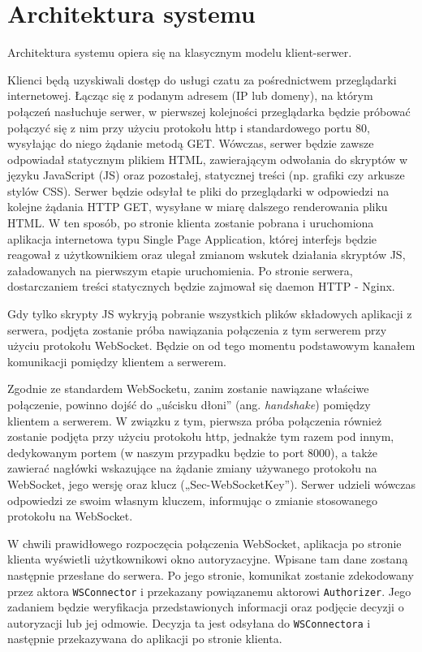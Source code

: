 \section{Architektura systemu}
\label{chat_architektura_systemu}

Architektura systemu opiera się na klasycznym modelu klient-serwer.

Klienci będą uzyskiwali dostęp do usługi czatu za pośrednictwem przeglądarki
internetowej. Łącząc się z podanym adresem (IP lub domeny), na którym połączeń
nasłuchuje serwer, w pierwszej kolejności przeglądarka będzie próbować połączyć
się z nim przy użyciu protokołu http i standardowego portu 80, wysyłając do
niego żądanie metodą GET. Wówczas, serwer będzie zawsze odpowiadał statycznym
plikiem HTML, zawierającym odwołania do skryptów w języku JavaScript (JS) oraz
pozostałej, statycznej treści (np. grafiki czy arkusze stylów CSS). Serwer
będzie odsyłał te pliki do przeglądarki w odpowiedzi na kolejne żądania HTTP
GET, wysyłane w miarę dalszego renderowania pliku HTML. W ten sposób, po stronie
klienta zostanie pobrana i uruchomiona aplikacja internetowa typu Single Page
Application, której interfejs będzie reagował z użytkownikiem oraz ulegał
zmianom wskutek działania skryptów JS, załadowanych na pierwszym etapie
uruchomienia. Po stronie serwera, dostarczaniem treści statycznych będzie
zajmował się daemon HTTP - Nginx.

Gdy tylko skrypty JS wykryją pobranie wszystkich plików składowych aplikacji
z serwera, podjęta zostanie próba nawiązania połączenia z tym serwerem przy
użyciu protokołu WebSocket. Będzie on od tego momentu podstawowym kanałem
komunikacji pomiędzy klientem a serwerem.

Zgodnie ze standardem WebSocketu, zanim zostanie nawiązane właściwe połączenie,
powinno dojść do „uścisku dłoni” (ang. \textit{handshake}) pomiędzy klientem a
serwerem. W związku z tym, pierwsza próba połączenia również zostanie podjęta
przy użyciu protokołu http, jednakże tym razem pod innym, dedykowanym portem
(w naszym przypadku będzie to port 8000), a także zawierać nagłówki wskazujące
na żądanie zmiany używanego protokołu na WebSocket, jego wersję oraz klucz
(„Sec-WebSocketKey”). Serwer udzieli wówczas odpowiedzi ze swoim własnym
kluczem, informując o zmianie stosowanego protokołu na WebSocket.

W chwili prawidłowego rozpoczęcia połączenia WebSocket, aplikacja po stronie
klienta wyświetli użytkownikowi okno autoryzacyjne. Wpisane tam dane zostaną
następnie przesłane do serwera. Po jego stronie, komunikat zostanie zdekodowany
przez aktora \texttt{WSConnector} i przekazany powiązanemu aktorowi
\texttt{Authorizer}. Jego zadaniem będzie weryfikacja przedstawionych informacji
oraz podjęcie decyzji o autoryzacji lub jej odmowie. Decyzja ta jest odsyłana do
\texttt{WSConnectora} i następnie przekazywana do aplikacji po stronie klienta.

